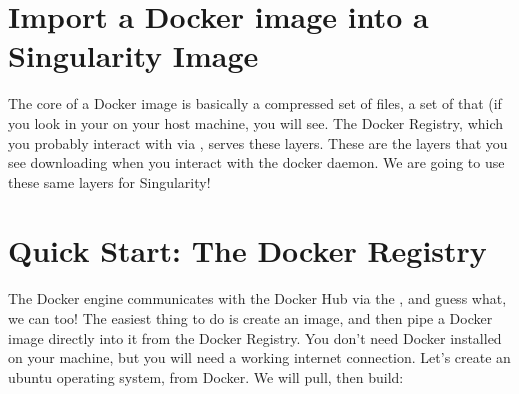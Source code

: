 \documentclass[letterpaper,10pt,english]{sphinxmanual}
\begin{document}
\section{Import a Docker image into a Singularity Image}
\label{\detokenize{singularity_and_docker:import-a-docker-image-into-a-singularity-image}}
The core of a Docker image is basically a compressed set of files, a set
of  that (if you look in your  on your host
machine, you will see. The Docker Registry, which you probably interact
with via , serves these layers. These are the layers that
you see downloading when you interact with the docker daemon. We are
going to use these same layers for Singularity!


\section{Quick Start: The Docker Registry}
\label{\detokenize{singularity_and_docker:quick-start-the-docker-registry}}
The Docker engine communicates with the Docker Hub via the , and guess what, we can too! The easiest thing to do is
create an image, and then pipe a Docker image directly into it from
the Docker Registry. You don’t need Docker installed on your machine,
but you will need a working internet connection. Let’s create an
ubuntu operating system, from Docker. We will pull, then build:
\end{document}
